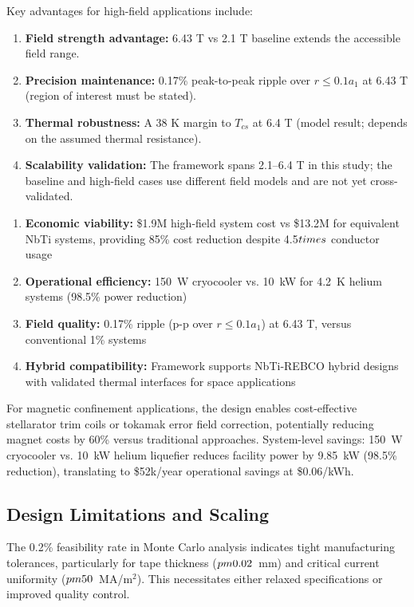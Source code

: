 \documentclass[aps,prb,preprint,amsmath,amssymb]{revtex4-2}
\begin{document}
Key advantages for high-field applications include:
\begin{enumerate}
\item \textbf{Field strength advantage:} 6.43 T vs 2.1 T baseline extends the accessible field range.
\item \textbf{Precision maintenance:} 0.17\% peak-to-peak ripple over $r\le0.1a_1$ at 6.43 T (region of interest must be stated).
\item \textbf{Thermal robustness:} A 38 K margin to $T_{cs}$ at 6.4 T (model result; depends on the assumed thermal resistance).
\item \textbf{Scalability validation:} The framework spans 2.1--6.4 T in this study; the baseline and high-field cases use different field models and are not yet cross-validated.
\end{enumerate}
\begin{enumerate}
\item \textbf{Economic viability:} \$1.9M high-field system cost vs \$13.2M for equivalent NbTi systems, providing 85\% cost reduction despite 4.5$\\times$ conductor usage
\item \textbf{Operational efficiency:} 150~W cryocooler vs. 10~kW for 4.2~K helium systems (98.5\% power reduction)
\item \textbf{Field quality:} 0.17\% ripple (p-p over $r\le0.1a_1$) at 6.43 T, versus conventional 1\% systems
\item \textbf{Hybrid compatibility:} Framework supports NbTi-REBCO hybrid designs with validated thermal interfaces for space applications
\end{enumerate}

For magnetic confinement applications, the design enables cost-effective stellarator trim coils or tokamak error field correction, potentially reducing magnet costs by 60\% versus traditional approaches. System-level savings: 150~W cryocooler vs. 10~kW helium liquefier reduces facility power by 9.85~kW (98.5\% reduction), translating to \$52k/year operational savings at \$0.06/kWh.

\subsection{Design Limitations and Scaling}

The 0.2\% feasibility rate in Monte Carlo analysis indicates tight manufacturing tolerances, particularly for tape thickness ($\\pm0.02$~mm) and critical current uniformity ($\\pm50$~MA/m$^2$). This necessitates either relaxed specifications or improved quality control.
\end{document}
